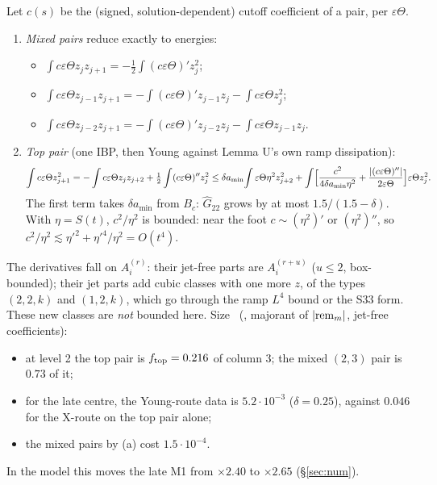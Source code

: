 \documentclass[11pt]{article}
\theoremstyle{remark}\newtheorem{remark}[theorem]{Remark}
\newcommand{\fn}[1]{\texttt{\detokenize{#1}}}
\begin{document}
\begin{lemma}[column $k=j+1$ by integration by parts; IBP + Young for the top pair]\label{lem:Y}
Let $c(s)$ be the (signed, solution-dependent) cutoff coefficient of a pair, per $\varepsilon\Theta$.
\begin{enumerate}[label=(\alph*),leftmargin=*]
\item \emph{Mixed pairs} reduce exactly to energies:
  \begin{itemize}[itemsep=0pt]
  \item $\int c\varepsilon\Theta z_jz_{j+1}=-\frac12\int(c\varepsilon\Theta)'z_j^2$;
  \item $\int c\varepsilon\Theta z_{j-1}z_{j+1}=-\int(c\varepsilon\Theta)'z_{j-1}z_j-\int c\varepsilon\Theta z_j^2$;
  \item $\int c\varepsilon\Theta z_{j-2}z_{j+1}=-\int(c\varepsilon\Theta)'z_{j-2}z_j-\int c\varepsilon\Theta z_{j-1}z_j$.
  \end{itemize}
\item \emph{Top pair} (one IBP, then Young against Lemma U's own ramp dissipation):
\[
\int c\varepsilon\Theta z_{j+1}^2=-\int c\varepsilon\Theta z_jz_{j+2}+\tfrac12\int(c\varepsilon\Theta)''z_j^2\le\delta a_{\min}\!\int\varepsilon\Theta\eta^2z_{j+2}^2+\int\Bigl[\frac{c^2}{4\delta a_{\min}\eta^2}+\frac{|(c\varepsilon\Theta)''|}{2\varepsilon\Theta}\Bigr]\varepsilon\Theta z_j^2 .
\]
The first term takes $\delta a_{\min}$ from $B_c$: $\hat G_{22}$ grows by at most $1.5/(1.5-\delta)$. With $\eta=S(t)$, $c^2/\eta^2$ is bounded: near the foot $c\sim(\eta^2)'$ or $(\eta^2)''$, so $c^2/\eta^2\lesssim\eta'^2+\eta'^4/\eta^2=O(t^4)$.
\end{enumerate}
The derivatives fall on $A_i^{(r)}$: their jet-free parts are $A_i^{(r+u)}$ ($u\le2$, box-bounded); their jet parts add cubic classes with one more $z$, of the types $(2,2,k)$ and $(1,2,k)$, which go through the ramp $L^4$ bound or the S33 form. These new classes are \emph{not} bounded here. Size \tE\ (\fn{top_pair_est.py}, majorant of $|{\rm rem}_m|$, jet-free coefficients):
\begin{itemize}[itemsep=0pt]
\item at level 2 the top pair is $f_{\rm top}=0.216$ of column 3; the mixed $(2,3)$ pair is $0.73$ of it;
\item for the late centre, the Young-route data is $5.2\cdot10^{-3}$ ($\delta=0.25$), against $0.046$ for the X-route on the top pair alone;
\item the mixed pairs by (a) cost $1.5\cdot10^{-4}$.
\end{itemize}
In the model this moves the late M1 from $\times2.40$ to $\times2.65$ (§\ref{sec:num}).
\end{lemma}
\end{document}
